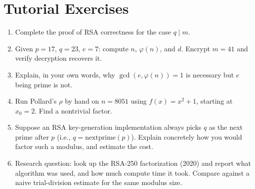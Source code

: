 \section*{Tutorial Exercises}
\begin{enumerate}
\item Complete the proof of RSA correctness for the case $q \mid m$.
\item Given $p = 17$, $q = 23$, $e = 7$: compute $n$, $\varphi(n)$, and $d$. Encrypt $m = 41$ and verify decryption recovers it.
\item Explain, in your own words, why $\gcd(e, \varphi(n)) = 1$ is necessary but $e$ being prime is not.
\item Run Pollard's $\rho$ by hand on $n = 8051$ using $f(x) = x^2 + 1$, starting at $x_0 = 2$. Find a nontrivial factor.
\item Suppose an RSA key-generation implementation always picks $q$ as the next prime after $p$ (i.e., $q = \text{nextprime}(p)$). Explain concretely how you would factor such a modulus, and estimate the cost.
\item Research question: look up the RSA-250 factorization (2020) and report what algorithm was used, and how much compute time it took. Compare against a naive trial-division estimate for the same modulus size.
\end{enumerate}
